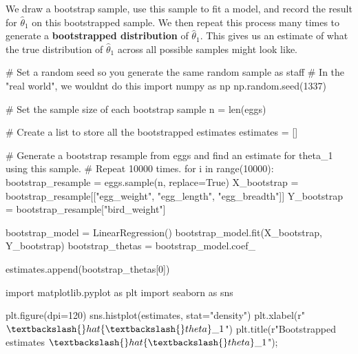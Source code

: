 \documentclass[
  letterpaper,
  DIV=11,
  numbers=noendperiod]{scrreprt}
\newenvironment{Shaded}{\begin{snugshade}}{\end{snugshade}}
\newcommand{\BuiltInTok}[1]{\textcolor[rgb]{0.00,0.23,0.31}{#1}}
\newcommand{\CommentTok}[1]{\textcolor[rgb]{0.37,0.37,0.37}{#1}}
\newcommand{\ControlFlowTok}[1]{\textcolor[rgb]{0.00,0.23,0.31}{#1}}
\newcommand{\DecValTok}[1]{\textcolor[rgb]{0.68,0.00,0.00}{#1}}
\newcommand{\ImportTok}[1]{\textcolor[rgb]{0.00,0.46,0.62}{#1}}
\newcommand{\KeywordTok}[1]{\textcolor[rgb]{0.00,0.23,0.31}{#1}}
\newcommand{\NormalTok}[1]{\textcolor[rgb]{0.00,0.23,0.31}{#1}}
\newcommand{\OperatorTok}[1]{\textcolor[rgb]{0.37,0.37,0.37}{#1}}
\newcommand{\StringTok}[1]{\textcolor[rgb]{0.13,0.47,0.30}{#1}}
\newcommand{\VariableTok}[1]{\textcolor[rgb]{0.07,0.07,0.07}{#1}}
\newcommand{\VerbatimStringTok}[1]{\textcolor[rgb]{0.13,0.47,0.30}{#1}}
\begin{document}
We draw a bootstrap sample, use this sample to fit a model, and record
the result for \(\hat{\theta}_1\) on this bootstrapped sample. We then
repeat this process many times to generate a \textbf{bootstrapped
distribution} of \(\hat{\theta}_1\). This gives us an estimate of what
the true distribution of \(\hat{\theta}_1\) across all possible samples
might look like.

\begin{Shaded}
\begin{Highlighting}[]
\CommentTok{\# Set a random seed so you generate the same random sample as staff}
\CommentTok{\# In the "real world", we wouldn\textquotesingle{}t do this}
\ImportTok{import}\NormalTok{ numpy }\ImportTok{as}\NormalTok{ np}
\NormalTok{np.random.seed(}\DecValTok{1337}\NormalTok{)}

\CommentTok{\# Set the sample size of each bootstrap sample}
\NormalTok{n }\OperatorTok{=} \BuiltInTok{len}\NormalTok{(eggs)}

\CommentTok{\# Create a list to store all the bootstrapped estimates}
\NormalTok{estimates }\OperatorTok{=}\NormalTok{ []}

\CommentTok{\# Generate a bootstrap resample from \textasciigrave{}eggs\textasciigrave{} and find an estimate for theta\_1 using this sample. }
\CommentTok{\# Repeat 10000 times.}
\ControlFlowTok{for}\NormalTok{ i }\KeywordTok{in} \BuiltInTok{range}\NormalTok{(}\DecValTok{10000}\NormalTok{):}
\NormalTok{    bootstrap\_resample }\OperatorTok{=}\NormalTok{ eggs.sample(n, replace}\OperatorTok{=}\VariableTok{True}\NormalTok{)}
\NormalTok{    X\_bootstrap }\OperatorTok{=}\NormalTok{ bootstrap\_resample[[}\StringTok{"egg\_weight"}\NormalTok{, }\StringTok{"egg\_length"}\NormalTok{, }\StringTok{"egg\_breadth"}\NormalTok{]]}
\NormalTok{    Y\_bootstrap }\OperatorTok{=}\NormalTok{ bootstrap\_resample[}\StringTok{"bird\_weight"}\NormalTok{]}
    
\NormalTok{    bootstrap\_model }\OperatorTok{=}\NormalTok{ LinearRegression()}
\NormalTok{    bootstrap\_model.fit(X\_bootstrap, Y\_bootstrap)}
\NormalTok{    bootstrap\_thetas }\OperatorTok{=}\NormalTok{ bootstrap\_model.coef\_}
    
\NormalTok{    estimates.append(bootstrap\_thetas[}\DecValTok{0}\NormalTok{])}
\end{Highlighting}
\end{Shaded}

\begin{Shaded}
\begin{Highlighting}[]
\ImportTok{import}\NormalTok{ matplotlib.pyplot }\ImportTok{as}\NormalTok{ plt}
\ImportTok{import}\NormalTok{ seaborn }\ImportTok{as}\NormalTok{ sns}

\NormalTok{plt.figure(dpi}\OperatorTok{=}\DecValTok{120}\NormalTok{)}
\NormalTok{sns.histplot(estimates, stat}\OperatorTok{=}\StringTok{"density"}\NormalTok{)}
\NormalTok{plt.xlabel(}\VerbatimStringTok{r"$\textbackslash{}hat\{\textbackslash{}theta\}\_1$"}\NormalTok{)}
\NormalTok{plt.title(}\VerbatimStringTok{r"Bootstrapped estimates $\textbackslash{}hat\{\textbackslash{}theta\}\_1$"}\NormalTok{)}\OperatorTok{;}
\end{Highlighting}
\end{Shaded}
\end{document}
